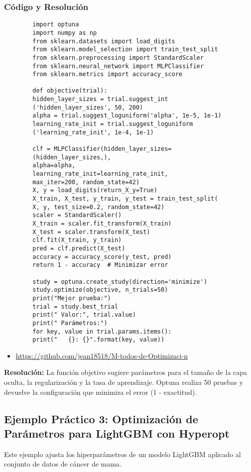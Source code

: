 \documentclass[12pt]{article}
\begin{document}
	\subsubsection*{Código y Resolución}
	\begin{verbatim}
		import optuna
		import numpy as np
		from sklearn.datasets import load_digits
		from sklearn.model_selection import train_test_split
		from sklearn.preprocessing import StandardScaler
		from sklearn.neural_network import MLPClassifier
		from sklearn.metrics import accuracy_score
		
		def objective(trial):
		hidden_layer_sizes = trial.suggest_int
		('hidden_layer_sizes', 50, 200)
		alpha = trial.suggest_loguniform('alpha', 1e-5, 1e-1)
		learning_rate_init = trial.suggest_loguniform
		('learning_rate_init', 1e-4, 1e-1)
		
		clf = MLPClassifier(hidden_layer_sizes=
		(hidden_layer_sizes,),
		alpha=alpha,
		learning_rate_init=learning_rate_init,
		max_iter=200, random_state=42)
		X, y = load_digits(return_X_y=True)
		X_train, X_test, y_train, y_test = train_test_split(
		X, y, test_size=0.2, random_state=42)
		scaler = StandardScaler()
		X_train = scaler.fit_transform(X_train)
		X_test = scaler.transform(X_test)
		clf.fit(X_train, y_train)
		pred = clf.predict(X_test)
		accuracy = accuracy_score(y_test, pred)
		return 1 - accuracy  # Minimizar error
		
		study = optuna.create_study(direction='minimize')
		study.optimize(objective, n_trials=50)
		print("Mejor prueba:")
		trial = study.best_trial
		print(" Valor:", trial.value)
		print(" Parámetros:")
		for key, value in trial.params.items():
		print("   {}: {}".format(key, value))
	\end{verbatim}
	\begin{itemize}
		\item \url{https://github.com/jean18518/M-todos-de-Optimizaci-n}
	\end{itemize}
	\textbf{Resolución:} La función objetivo sugiere parámetros para el tamaño de la capa oculta, la regularización y la tasa de aprendizaje. Optuna realiza 50 pruebas y devuelve la configuración que minimiza el error (1 - exactitud).
	

	\subsection{Ejemplo Práctico 3: Optimización de Parámetros para LightGBM con Hyperopt}
	Este ejemplo ajusta los hiperparámetros de un modelo LightGBM aplicado al conjunto de datos de cáncer de mama.
	
\end{document}
